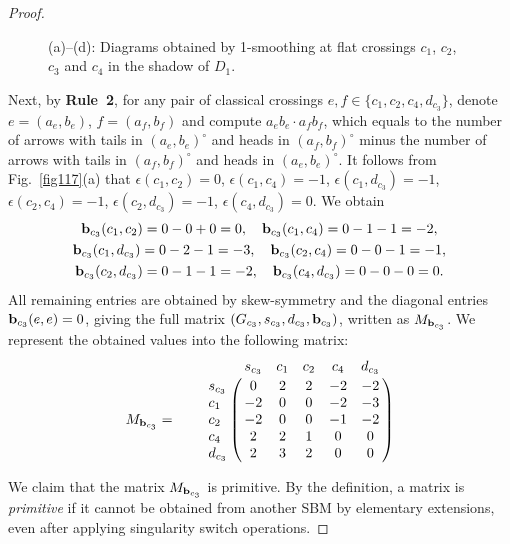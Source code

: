 \documentclass[12pt]{amsart}
\theoremstyle{noparens}
\numberwithin{equation}{section}
\numberwithin{equation}{section}
\begin{document}
\begin{proof}
\begin{figure}[!ht]
\begin{center}
			\caption{(a)--(d): Diagrams obtained by 1-smoothing at flat crossings $c_1$, $c_2$, $c_3$ and $c_4$ in the shadow of $D_1$.} \label{figXX}
		\end{center}
	\end{figure} 
	Next, by {\bf Rule~2}, for any pair of classical crossings $e,f \in \{c_1,c_2,c_4,d_{c_3}\}$, denote $e=(a_e,b_e)$, $f=(a_f,b_f)$ and compute
	$a_eb_e \cdot a_fb_f$, which equals to the number of arrows with tails in  $(a_e,b_e)^\circ$ and heads in $(a_f,b_f)^\circ$ minus the number of arrows with tails in $(a_f,b_f)^\circ$ and heads in $(a_e,b_e)^\circ$.
	It follows from Fig.~\ref{fig117}(a) that $\epsilon(c_1,c_2)=0$, $\epsilon(c_1,c_4)=-1$, $\epsilon(c_1,d_{c_3})=-1$, $\epsilon(c_2,c_4)=-1$, $\epsilon(c_2,d_{c_3})=-1$, $\epsilon(c_4,d_{c_3})=0$. We obtain
	$$
	\begin{gathered} 
		{\bf b}_{c_3}(c_1,c_2)=0-0+0=0, \quad {\bf b}_{c_3}(c_1,c_4)=0-1-1=-2,  \cr {\bf b}_{c_3}(c_1,d_{c_3})=0-2-1=-3,  \quad 
		{\bf b}_{c_3}(c_2,c_4)=0-0-1=-1, \cr {\bf b}_{c_3}(c_2,d_{c_3})=0-1-1=-2, \quad {\bf b}_{c_3}(c_4,d_{c_3})=0-0-0=0.
	\end{gathered}
	$$
	All remaining entries are obtained by skew-symmetry and the diagonal entries ${\bf b}_{c_3}(e,e)=0$, giving the full matrix $(G_{c_3}, s_{c_3}, d_{c_3}, {\bf b}_{c_3})$, written as $M_{{\bf b}_{c_3}}$. We represent the obtained values into the following matrix:
	$$	
	M_{{\bf b}_{c_3}} = \qquad \bordermatrix{
		&     s_{c_3} &  c_1 & c_2 & c_4 & d_{c_3}  \cr
		s_{c_3}   & 0 &  2 & 2 &-2 &-2  \cr
		c_1   &-2 &  0 & 0 &-2 &-3  \cr
		c_2   &-2 &  0 & 0 &-1 &-2  \cr
		c_4   & 2 &  2 & 1 & 0 & 0  \cr
		d_{c_3}   & 2 &  3 & 2 & 0 & 0  \cr	 
	}
	$$

	We claim that the matrix $M_{{\bf b}_{c_3}}$ is primitive. By the definition, a matrix is \textit{primitive} if it cannot be obtained from another SBM by elementary extensions, even after applying singularity switch operations.
	

\end{proof}
\end{document}
